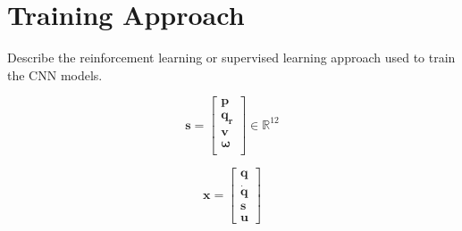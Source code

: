 \section{Training Approach}

\begin{outline}
  Describe the reinforcement learning or supervised learning approach
  used to train the CNN models.
\end{outline}

\[
  \mathbf{s} =
  \begin{bmatrix}
    \mathbf{p} \\
    \mathbf{q_r} \\
    \mathbf{v} \\
    \mathbf{\omega} \\
  \end{bmatrix} \in \mathbb{R}^{12}
\]

\[
  \mathbf{x} =
  \begin{bmatrix}
    \mathbf{q} \\
    \mathbf{\dot q} \\
    \mathbf{s} \\
    \mathbf{u}
  \end{bmatrix}
\]

